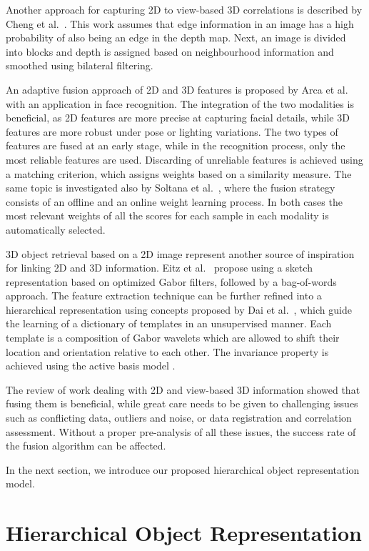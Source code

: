 \documentclass[runningheads]{llncs}
\begin{document}
Another approach for capturing 2D to view-based 3D correlations is described by Cheng et al.~\cite{Cheng2010}. This work assumes that edge information in an image has a high probability of also being an edge in the depth map. Next, an image is divided into blocks and depth is assigned based on neighbourhood information and smoothed using bilateral filtering.

An adaptive fusion approach of 2D and 3D features is proposed by Arca et al.~\cite{Arca2007} with an application in face recognition. The integration of the two modalities is beneficial, as 2D features are more precise at capturing facial details, while 3D features are more robust under pose or lighting variations. The two types of features are fused at an early stage, while in the recognition process, only the most reliable features are used. Discarding of unreliable features is achieved using a matching criterion, which assigns weights based on a similarity measure. The same topic is investigated also by Soltana et al.~\cite{Soltana2010}, where the fusion strategy consists of an offline and an online weight learning process. In both cases the most relevant weights of all the scores for each sample in each modality is automatically selected.

3D object retrieval based on a 2D image represent another source of inspiration for linking 2D and 3D information. Eitz et al.~\cite{Eitz2012} propose using a sketch representation based on optimized Gabor filters, followed by a bag-of-words approach. The feature extraction technique can be further refined into a hierarchical representation using concepts proposed by Dai et al.~\cite{Dai2014}, which guide the learning of a dictionary of templates in an unsupervised manner. Each template is a composition of Gabor wavelets which are allowed to shift their location and orientation relative to each other. The invariance property is achieved using the active basis model \cite{Wu2010}.

The review of work dealing with 2D and view-based 3D information showed that fusing them is beneficial, while great care needs to be given to challenging issues such as conflicting data, outliers and noise, or data registration and correlation assessment. Without a proper pre-analysis of all these issues, the success rate of the fusion algorithm can be affected. 

In the next section, we introduce our proposed hierarchical object representation model.  

\section{Hierarchical Object Representation} 
\label{sec:learning}    
\end{document}
